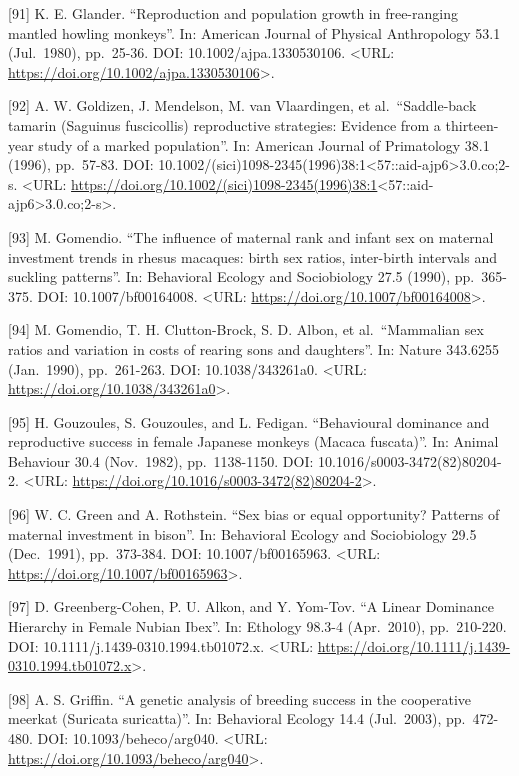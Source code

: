 \documentclass[
]{article}
\begin{document}
{[}91{]} K. E. Glander. ``Reproduction and population growth in
free-ranging mantled howling monkeys''. In: American Journal of Physical
Anthropology 53.1 (Jul.~1980), pp.~25-36. DOI: 10.1002/ajpa.1330530106.
\textless URL:
\url{https://doi.org/10.1002/ajpa.1330530106}\textgreater.

{[}92{]} A. W. Goldizen, J. Mendelson, M. van Vlaardingen, et
al.~``Saddle-back tamarin (Saguinus fuscicollis) reproductive
strategies: Evidence from a thirteen-year study of a marked
population''. In: American Journal of Primatology 38.1 (1996),
pp.~57-83. DOI:
10.1002/(sici)1098-2345(1996)38:1\textless57::aid-ajp6\textgreater3.0.co;2-s.
\textless URL:
\url{https://doi.org/10.1002/(sici)1098-2345(1996)38:1}\textless57::aid-ajp6\textgreater3.0.co;2-s\textgreater.

{[}93{]} M. Gomendio. ``The influence of maternal rank and infant sex on
maternal investment trends in rhesus macaques: birth sex ratios,
inter-birth intervals and suckling patterns''. In: Behavioral Ecology
and Sociobiology 27.5 (1990), pp.~365-375. DOI: 10.1007/bf00164008.
\textless URL: \url{https://doi.org/10.1007/bf00164008}\textgreater.

{[}94{]} M. Gomendio, T. H. Clutton-Brock, S. D. Albon, et
al.~``Mammalian sex ratios and variation in costs of rearing sons and
daughters''. In: Nature 343.6255 (Jan.~1990), pp.~261-263. DOI:
10.1038/343261a0. \textless URL:
\url{https://doi.org/10.1038/343261a0}\textgreater.

{[}95{]} H. Gouzoules, S. Gouzoules, and L. Fedigan. ``Behavioural
dominance and reproductive success in female Japanese monkeys (Macaca
fuscata)''. In: Animal Behaviour 30.4 (Nov.~1982), pp.~1138-1150. DOI:
10.1016/s0003-3472(82)80204-2. \textless URL:
\url{https://doi.org/10.1016/s0003-3472(82)80204-2}\textgreater.

{[}96{]} W. C. Green and A. Rothstein. ``Sex bias or equal opportunity?
Patterns of maternal investment in bison''. In: Behavioral Ecology and
Sociobiology 29.5 (Dec.~1991), pp.~373-384. DOI: 10.1007/bf00165963.
\textless URL: \url{https://doi.org/10.1007/bf00165963}\textgreater.

{[}97{]} D. Greenberg-Cohen, P. U. Alkon, and Y. Yom-Tov. ``A Linear
Dominance Hierarchy in Female Nubian Ibex''. In: Ethology 98.3-4
(Apr.~2010), pp.~210-220. DOI: 10.1111/j.1439-0310.1994.tb01072.x.
\textless URL:
\url{https://doi.org/10.1111/j.1439-0310.1994.tb01072.x}\textgreater.

{[}98{]} A. S. Griffin. ``A genetic analysis of breeding success in the
cooperative meerkat (Suricata suricatta)''. In: Behavioral Ecology 14.4
(Jul.~2003), pp.~472-480. DOI: 10.1093/beheco/arg040. \textless URL:
\url{https://doi.org/10.1093/beheco/arg040}\textgreater.
\end{document}
